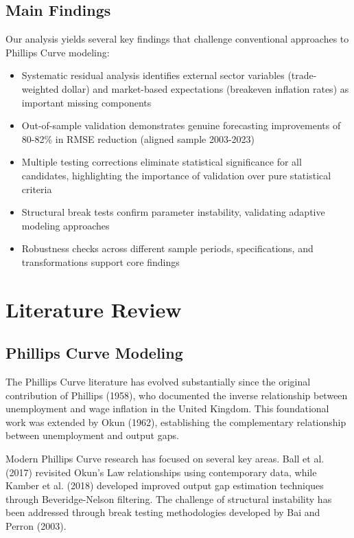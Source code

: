 \documentclass[12pt]{article}
\begin{document}
\subsection{Main Findings}

Our analysis yields several key findings that challenge conventional approaches to Phillips Curve modeling:

\begin{itemize}
\item Systematic residual analysis identifies external sector variables (trade-weighted dollar) and market-based expectations (breakeven inflation rates) as important missing components
\item Out-of-sample validation demonstrates genuine forecasting improvements of 80-82\% in RMSE reduction (aligned sample 2003-2023)
\item Multiple testing corrections eliminate statistical significance for all candidates, highlighting the importance of validation over pure statistical criteria  
\item Structural break tests confirm parameter instability, validating adaptive modeling approaches
\item Robustness checks across different sample periods, specifications, and transformations support core findings
\end{itemize}

\section{Literature Review}

\subsection{Phillips Curve Modeling}

The Phillips Curve literature has evolved substantially since the original contribution of Phillips (1958), who documented the inverse relationship between unemployment and wage inflation in the United Kingdom. This foundational work was extended by Okun (1962), establishing the complementary relationship between unemployment and output gaps.

Modern Phillips Curve research has focused on several key areas. Ball et al. (2017) revisited Okun's Law relationships using contemporary data, while Kamber et al. (2018) developed improved output gap estimation techniques through Beveridge-Nelson filtering. The challenge of structural instability has been addressed through break testing methodologies developed by Bai and Perron (2003).
\end{document}
